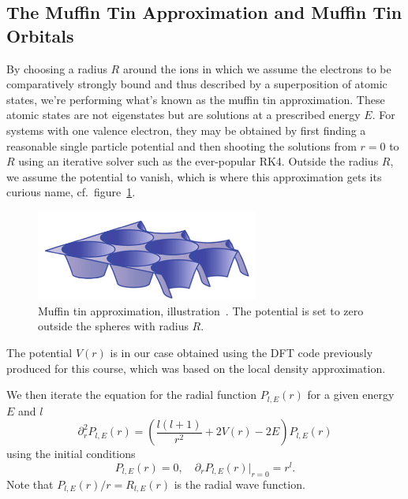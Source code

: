 \documentclass[a4paper,DIV=12,english]{scrartcl}
\begin{document}
\subsection{The Muffin Tin Approximation and Muffin Tin Orbitals}
By choosing a radius $R$ around the ions in which we assume the electrons to be comparatively strongly bound and thus described by a superposition of atomic states, we're performing what's known as the muffin tin approximation. These atomic states are not eigenstates but are solutions at a prescribed energy $E$. For systems with one valence electron, they may be obtained by first finding a reasonable single particle potential and then shooting the solutions from $r=0$ to $R$ using an iterative solver such as the ever-popular RK4. Outside the radius $R$, we assume the potential to vanish, which is where this approximation gets its curious name, cf.\ figure~\ref{fig:mtinapprox}.

\begin{figure}
    \centering 
    \includegraphics[width=0.65\textwidth]{./fig/mtin.png}
    \caption{Muffin tin approximation, illustration~\cite{Böer2019}. The potential is set to zero outside the spheres with radius $R$.}
    \label{fig:mtinapprox}
\end{figure}

The potential $V(r)$ is in our case obtained using the DFT code previously produced for this course, which was based on the local density approximation.

We then iterate the equation for the radial function $P_{l,E}(r)$ for a given energy $E$ and $l$
\begin{equation}
    \partial_r^2 P_{l,E}(r) = \left(\frac{l(l+1)}{r^2} + 2V(r) - 2E\right)P_{l,E}(r)
\end{equation}
using the initial conditions
\begin{equation}
    P_{l,E}(r) = 0, \quad \partial_r P_{l,E}(r)|_{r=0} = r^l.
\end{equation}
Note that $P_{l,E}(r)/r = R_{l,E}(r)$ is the radial wave function.
\end{document}
